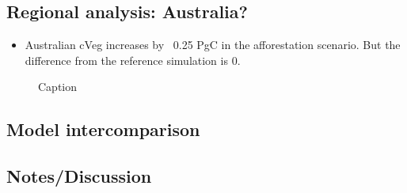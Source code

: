 \documentclass[]{article}
\begin{document}
\pagebreak

\subsection{Regional analysis: Australia?}

\begin{itemize}
    \item Australian cVeg increases by ~0.25 PgC in the afforestation scenario. But the difference from the reference simulation is 0.
\end{itemize}

\begin{figure}
    \centering
    \begin{subfigure}[b]{0.4\linewidth}
        
    \end{subfigure}
    \begin{subfigure}[b]{0.4\linewidth}
        
    \end{subfigure}
    \begin{subfigure}[b]{0.4\linewidth}
        
    \end{subfigure}
    \begin{subfigure}[b]{0.4\linewidth}
        
    \end{subfigure}
    \begin{subfigure}[b]{0.4\linewidth}
        
    \end{subfigure}
    \begin{subfigure}[b]{0.4\linewidth}
        
    \end{subfigure}
    \caption{Caption}
    \label{fig:aus_region}
\end{figure}

\subsection{Model intercomparison}


\subsection{Notes/Discussion}
\end{document}
